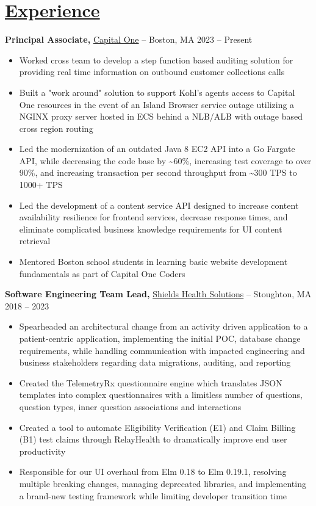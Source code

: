 \documentclass[10pt,letterpaper]{article}
\begin{document}
\section*{\href{https://www.reddit.com/r/EngineeringResumes/wiki/index\#wiki_work_experience}{Experience}}
\textbf{Principal Associate,} \href{https://www.fstl1992.com/}{Capital One} -- Boston, MA \hfill 2023 -- Present \\
\vspace{-9pt}
\begin{itemize}
  \item Worked cross team to develop a step function based auditing solution for providing real time information on outbound customer collections calls
  \item Built a "work around" solution to support Kohl's agents access to Capital One resources in the event of an Island Browser service outage utilizing a NGINX proxy server hosted in ECS behind a NLB/ALB with outage based cross region routing
  \item Led the modernization of an outdated Java 8 EC2 API into a Go Fargate API, while decreasing the code base by \textasciitilde{}60\%, increasing test coverage to over 90\%, and increasing transaction per second throughput from \textasciitilde{}300 TPS to 1000+ TPS
  \item Led the development of a content service API designed to increase content availability resilience for frontend services, decrease response times, and eliminate complicated business knowledge requirements for UI content retrieval
  \item Mentored Boston school students in learning basic website development fundamentals as part of Capital One Coders
\end{itemize}

\textbf{Software Engineering Team Lead,} \href{https://www.fstl1992.com/}{Shields Health Solutions} -- Stoughton, MA \hfill 2018 -- 2023 \\
\vspace{-9pt}
\begin{itemize}
   \item Spearheaded an architectural change from an activity driven application to a patient-centric application, implementing the initial POC, database change requirements, while handling communication with impacted engineering and business stakeholders regarding data migrations, auditing, and reporting
  \item Created the TelemetryRx questionnaire engine which translates JSON templates into complex questionnaires with a limitless number of questions, question types, inner question associations and interactions
  \item Created a tool to automate Eligibility Verification (E1) and Claim Billing (B1) test claims through RelayHealth to dramatically improve end user productivity
  \item Responsible for our UI overhaul from Elm 0.18 to Elm 0.19.1, resolving multiple breaking changes, managing deprecated libraries, and implementing a brand-new testing framework while limiting developer transition time
\end{itemize}
\end{document}
